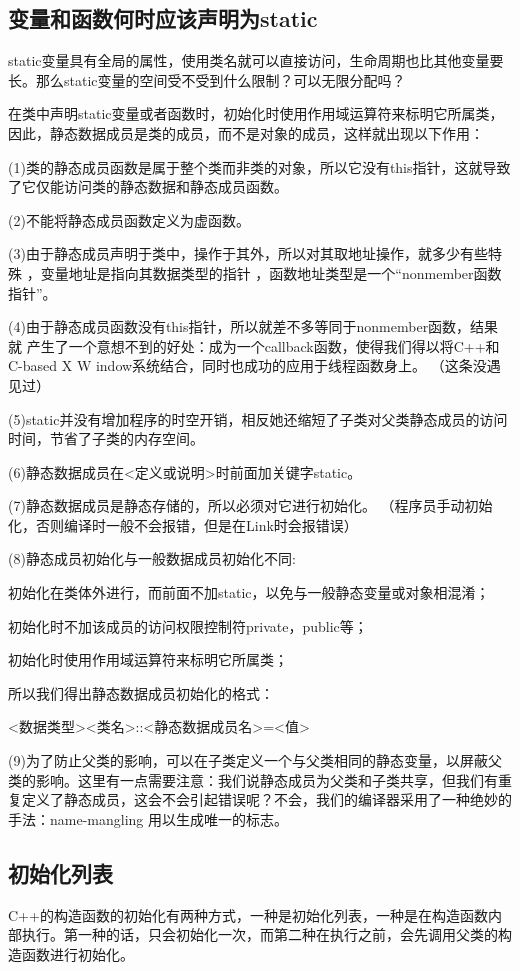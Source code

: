 \subsection{变量和函数何时应该声明为static}
static变量具有全局的属性，使用类名就可以直接访问，生命周期也比其他变量要长。那么static变量的空间受不受到什么限制？可以无限分配吗？

在类中声明static变量或者函数时，初始化时使用作用域运算符来标明它所属类，因此，静态数据成员是类的成员，而不是对象的成员，这样就出现以下作用：

(1)类的静态成员函数是属于整个类而非类的对象，所以它没有this指针，这就导致 了它仅能访问类的静态数据和静态成员函数。      

(2)不能将静态成员函数定义为虚函数。      

(3)由于静态成员声明于类中，操作于其外，所以对其取地址操作，就多少有些特殊 ，变量地址是指向其数据类型的指针 ，函数地址类型是一个“nonmember函数指针”。

(4)由于静态成员函数没有this指针，所以就差不多等同于nonmember函数，结果就 产生了一个意想不到的好处：成为一个callback函数，使得我们得以将C++和C-based X W indow系统结合，同时也成功的应用于线程函数身上。 （这条没遇见过）  

(5)static并没有增加程序的时空开销，相反她还缩短了子类对父类静态成员的访问 时间，节省了子类的内存空间。      

(6)静态数据成员在<定义或说明>时前面加关键字static。      

(7)静态数据成员是静态存储的，所以必须对它进行初始化。 （程序员手动初始化，否则编译时一般不会报错，但是在Link时会报错误） 

(8)静态成员初始化与一般数据成员初始化不同:

初始化在类体外进行，而前面不加static，以免与一般静态变量或对象相混淆；

初始化时不加该成员的访问权限控制符private，public等；     
   
初始化时使用作用域运算符来标明它所属类；

所以我们得出静态数据成员初始化的格式：

<数据类型><类名>::<静态数据成员名>=<值>

(9)为了防止父类的影响，可以在子类定义一个与父类相同的静态变量，以屏蔽父类的影响。这里有一点需要注意：我们说静态成员为父类和子类共享，但我们有重复定义了静态成员，这会不会引起错误呢？不会，我们的编译器采用了一种绝妙的手法：name-mangling 用以生成唯一的标志。
\subsection{初始化列表}
C++的构造函数的初始化有两种方式，一种是初始化列表，一种是在构造函数内部执行。第一种的话，只会初始化一次，而第二种在执行之前，会先调用父类的构造函数进行初始化。

